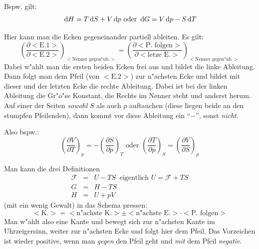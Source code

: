 \begin{description}[\setlabelstyle{\bfseries\slshape}]
Bspw. gilt:
\begin{equation*}
   \, \mathrm{d} H = T \, \mathrm{d} S + V \, \mathrm{d} p \text{ oder } \, \mathrm{d} G = V \, \mathrm{d} p -
   S \, \mathrm{d} T
\end{equation*}
\item[\textsc{Maxwell}-Beziehungen] 
Hier kann man die Ecken gegeneinander partiell ableiten. Es gilt:
\begin{equation}
   \label{eq:432}
   \left ( \frac{\partial <\text{E.1}>}{\partial <\text{E.2}>} \right
   )_{<\text{Nenner gegen"ub.}>} = \left ( \frac{\partial
        <\text{P. folgen}>}{\partial <\text{letze E.}>} \right
   )_{<\text{Nenner gegen"ub.}>}
\end{equation}
Dabei w"ahlt man die ersten beiden Ecken frei aus und bildet die linke
Ableitung.  Dann folgt
man dem Pfeil (von $<\text{E.2}>$) zur n"achsten Ecke und bildet mit
dieser und der letzten Ecke die rechte Ableitung. Dabei ist bei der
linken Ableitung die Gr"o"se Konstant, die Rechts im Nenner steht und
anderst herum.  Auf einer der Seiten \emph{sowohl} $S$ als auch $p$
auftauchen (diese liegen beide an den stumpfen Pfeilenden), dann kommt
vor diese Ableitung ein "`$-$"', sonst \emph{nicht}.

Also bspw.:
\begin{equation*}
   \left ( \frac{\partial V}{\partial T} \right )_p = - \left (
      \frac{\partial S}{\partial p} \right )_T
\text{ oder }
\left ( \frac{\partial T}{\partial p} \right )_S = \left ( \frac{\partial V}{\partial S} \right )_p
\end{equation*}

\item[Definitionen] 
Man kann die drei Definitionen 
\begin{eqnarray*}
   \mathcal F &=& U - TS ~  \text{ eigentlich } U = \mathcal F + TS\\
G &=& H - TS \\
H &=& U + pV
\end{eqnarray*}
(mit ein wenig Gewalt) in das Schema pressen:
\begin{equation}
   \label{eq:433}
<\text{K.}> = <\text{n"achste K.}> \pm <\text{n"achste E.}> \cdot
<\text{P. folgen}>
\end{equation}
Man w"ahlt also eine Kante und bewegt sich zur n"achsten Kante im
Uhrzeigersinn, weiter zur n"achsten Ecke und folgt hier dem Pfeil.
Das Vorzeichen ist wieder positive, wenn man \emph{gegen} den Pfeil
geht und \emph{mit} dem Pfeil \emph{negativ}.
\end{description}

